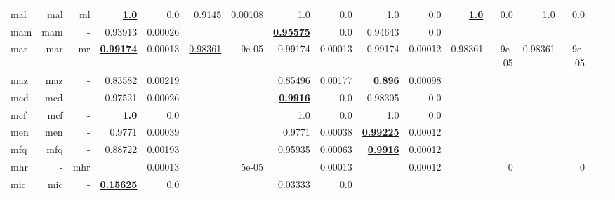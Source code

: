 \documentclass[11pt]{article}
\begin{document}
\begin{table*}[h]
{\begin{tabular}{lrrrrrrrrrrrrrrrr}
mal         & mal         & ml         & \textbf{\underline{1.0}}         & 0.0         & 0.9145         & 0.00108         & 1.0         & 0.0         & 1.0         & 0.0         & \textbf{\underline{1.0}}         & 0.0         & 1.0         & 0.0         \\
mam         & mam         & -         & 0.93913         & 0.00026         &          &          & \textbf{\underline{0.95575}}         & 0.0         & 0.94643         & 0.0         &          &          &          &          \\
mar         & mar         & mr         & \textbf{\underline{0.99174}}         & 0.00013         & \underline{0.98361}         & 9e-05         & 0.99174         & 0.00013         & 0.99174         & 0.00012         & 0.98361         & 9e-05         & 0.98361         & 9e-05         \\
maz         & maz         & -         & 0.83582         & 0.00219         &          &          & 0.85496         & 0.00177         & \textbf{\underline{0.896}}         & 0.00098         &          &          &          &          \\
mcd         & mcd         & -         & 0.97521         & 0.00026         &          &          & \textbf{\underline{0.9916}}         & 0.0         & 0.98305         & 0.0         &          &          &          &          \\
mcf         & mcf         & -         & \textbf{\underline{1.0}}         & 0.0         &          &          & 1.0         & 0.0         & 1.0         & 0.0         &          &          &          &          \\
men         & men         & -         & 0.9771         & 0.00039         &          &          & 0.9771         & 0.00038         & \textbf{\underline{0.99225}}         & 0.00012         &          &          &          &          \\
mfq         & mfq         & -         & 0.88722         & 0.00193         &          &          & 0.95935         & 0.00063         & \textbf{\underline{0.9916}}         & 0.00012         &          &          &          &          \\
mhr         & -         & mhr         &          & 0.00013         &          & 5e-05         &          & 0.00013         &          & 0.00012         &          & 0         &          & 0         \\
mic         & mic         & -         & \textbf{\underline{0.15625}}         & 0.0         &          &          & 0.03333         & 0.0         &          &          &          &          &          &          \\

\end{tabular}}
\end{table*}
\end{document}
